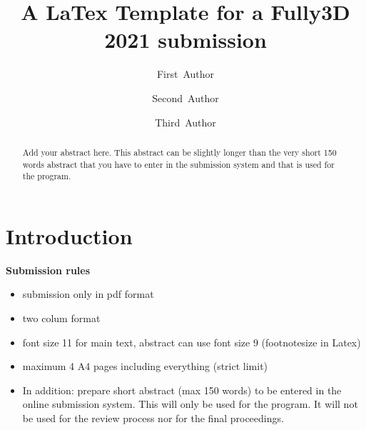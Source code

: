 \documentclass[11pt,twocolumn,twoside]{article}
\begin{document}

\title{\sffamily\bfseries A LaTex Template for a Fully3D 2021 submission} 

\author[1]{\small First~Author}
\author[1]{\small Second~Author}
\author[2]{\small Third~Author}



\date{}

\maketitle
\thispagestyle{fancy}

\begin{abstract}
\footnotesize\bfseries

Add your abstract here. This abstract can be slightly longer than the very short 
150 words abstract that you have to enter in the submission system and that is used 
for the program. 
\end{abstract}



\section{Introduction}

\textbf{\color{red}Submission rules}
\begin{itemize}[itemsep=0pt,parsep=0pt,topsep=0pt, partopsep=0pt]
\color{red}
\item submission only in pdf format
\item two colum format
\item font size 11 for main text, abstract can use font size 9 (footnotesize in Latex)
\item maximum 4 A4 pages including everything (strict limit)
\item In addition: prepare short abstract (max 150 words) to be entered in the online submission system. 
      This will only be used for the program. 
      It will not be used for the review process nor for the final proceedings.
\end{itemize}
\end{document}
